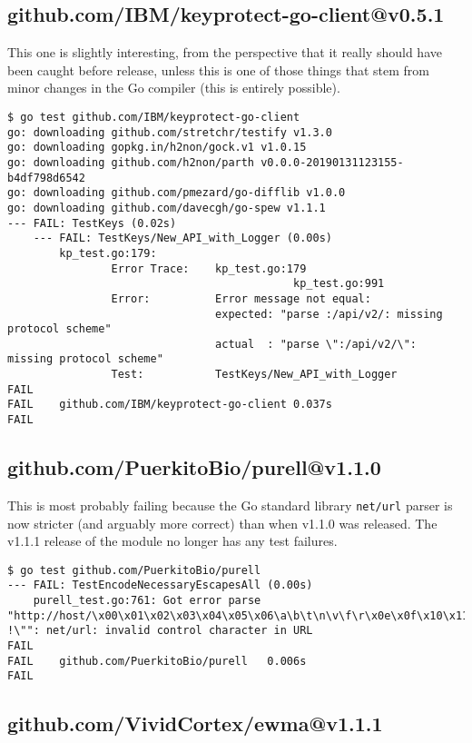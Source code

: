 \documentclass[a4paper]{paper}
\begin{document}
\subsection{github.com/IBM/keyprotect-go-client@v0.5.1}

This one is slightly interesting, from the perspective that it really
should have been caught before release, unless this is one of those
things that stem from minor changes in the Go compiler (this is
entirely possible).

\begin{verbatim}
$ go test github.com/IBM/keyprotect-go-client
go: downloading github.com/stretchr/testify v1.3.0
go: downloading gopkg.in/h2non/gock.v1 v1.0.15
go: downloading github.com/h2non/parth v0.0.0-20190131123155-b4df798d6542
go: downloading github.com/pmezard/go-difflib v1.0.0
go: downloading github.com/davecgh/go-spew v1.1.1
--- FAIL: TestKeys (0.02s)
    --- FAIL: TestKeys/New_API_with_Logger (0.00s)
        kp_test.go:179: 
            	Error Trace:	kp_test.go:179
            	            				kp_test.go:991
            	Error:      	Error message not equal:
            	            	expected: "parse :/api/v2/: missing protocol scheme"
            	            	actual  : "parse \":/api/v2/\": missing protocol scheme"
            	Test:       	TestKeys/New_API_with_Logger
FAIL
FAIL	github.com/IBM/keyprotect-go-client	0.037s
FAIL
\end{verbatim}

\subsection{github.com/PuerkitoBio/purell@v1.1.0}

This is most probably failing because the Go standard library {\tt net/url}
parser is now stricter (and arguably more correct) than when v1.1.0
was released. The v1.1.1 release of the module no longer has any test
failures.

\begin{verbatim}
$ go test github.com/PuerkitoBio/purell       
--- FAIL: TestEncodeNecessaryEscapesAll (0.00s)
    purell_test.go:761: Got error parse "http://host/\x00\x01\x02\x03\x04\x05\x06\a\b\t\n\v\f\r\x0e\x0f\x10\x11\x12\x13\x14\x15\x16\x17\x18\x19\x1a\x1b\x1c\x1d\x1e\x1f !\"": net/url: invalid control character in URL
FAIL
FAIL	github.com/PuerkitoBio/purell	0.006s
FAIL
\end{verbatim}

\subsection{github.com/VividCortex/ewma@v1.1.1}
\end{document}
